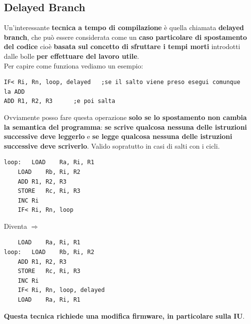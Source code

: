 \documentclass[10pt]{report}
\begin{document}
\subsection{Delayed Branch}
Un'interessante \textbf{tecnica a tempo di compilazione} è quella chiamata \textbf{delayed branch}, che può essere considerata come un \textbf{caso particolare di spostamento del codice} cioè \textbf{basata sul concetto di sfruttare i tempi morti} introdotti dalle bolle \textbf{per effettuare del lavoro utile}.\\
Per capire come funziona vediamo un esempio:
\begin{lstlisting}
IF<	Ri, Rn, loop, delayed	;se il salto viene preso esegui comunque la ADD
ADD	R1, R2, R3		;e poi salta
\end{lstlisting}
Ovviamente posso fare questa operazione \textbf{solo se lo spostamento non cambia la semantica del programma}: \textbf{se scrive qualcosa nessuna delle istruzioni successive deve leggerlo} e \textbf{se legge qualcosa nessuna delle istruzioni successive deve scriverlo}. Valido sopratutto in casi di salti con i cicli.
\begin{multicols}{2}
\begin{lstlisting}
loop:	LOAD	Ra, Ri, R1
	LOAD	Rb, Ri, R2
	ADD	R1, R2, R3
	STORE	Rc, Ri, R3
	INC	Ri
	IF<	Ri, Rn, loop
\end{lstlisting}
\begin{center}
Diventa $\Rightarrow$
\end{center}
\columnbreak
\begin{lstlisting}
	LOAD	Ra, Ri, R1
loop:	LOAD	Rb, Ri, R2
	ADD	R1, R2, R3
	STORE	Rc, Ri, R3
	INC	Ri
	IF<	Ri, Rn, loop, delayed
	LOAD	Ra, Ri, R1
\end{lstlisting}
\end{multicols}
\textbf{Questa tecnica richiede una modifica firmware, in particolare sulla IU}.
\end{document}
